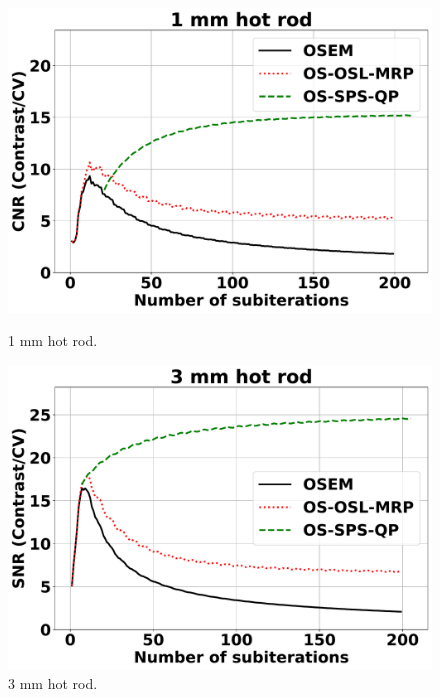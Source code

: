 \documentclass[utf8]{FrontiersinHarvard} %
\begin{document}
\begin{subfigure}
    \centering
    	\setcounter{figure}{2}
	\setcounter{subfigure}{0}
    \begin{minipage}[b]{0.3\textwidth}
        \includegraphics[width=\linewidth]{Figures/SNR_1mmHotRod.pdf}
        \caption{1 mm hot rod.}
        \label{fig:1mmRod}
    \end{minipage}  
   
	\setcounter{figure}{2}
	\setcounter{subfigure}{1}
    \begin{minipage}[b]{0.3\textwidth}
        \includegraphics[width=\linewidth]{Figures/SNR_3mmHotRod.pdf}
        \caption{3 mm hot rod.}
        \label{fig:3mmRod}
    \end{minipage}
    

\end{subfigure}
\end{document}
